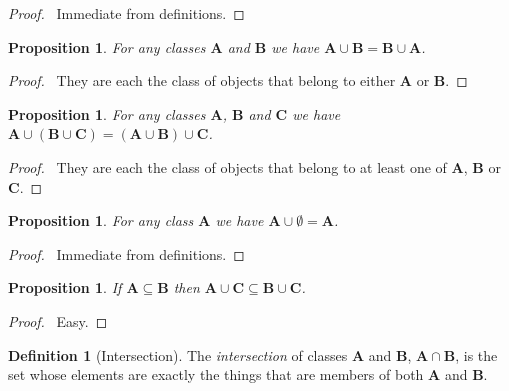 \documentclass{article}
\let\qed\relax
\newtheorem{proposition}[axiom]{Proposition}
\theoremstyle{definition}
\newtheorem{definition}[axiom]{Definition}
\begin{document}
    \begin{proof}
        \pf\ Immediate from definitions. \qed
    \end{proof}

    \begin{proposition}
        For any classes $\mathbf{A}$ and $\mathbf{B}$ we have $\mathbf{A} \cup \mathbf{B}
        = \mathbf{B} \cup \mathbf{A}$.
    \end{proposition}

    \begin{proof}
        \pf\ They are each the class of objects that belong to either $\mathbf{A}$ or $\mathbf{B}$. \qed
    \end{proof}

    \begin{proposition}
        For any classes $\mathbf{A}$, $\mathbf{B}$ and $\mathbf{C}$ we have
        $\mathbf{A} \cup (\mathbf{B} \cup \mathbf{C}) = (\mathbf{A} \cup \mathbf{B}) \cup \mathbf{C}$.
    \end{proposition}

    \begin{proof}
        \pf\ They are each the class of objects that belong to at least one of $\mathbf{A}$,
        $\mathbf{B}$ or $\mathbf{C}$. \qed
    \end{proof}

    \begin{proposition}
        For any class $\mathbf{A}$ we have $\mathbf{A} \cup \emptyset = \mathbf{A}$.
    \end{proposition}

    \begin{proof}
        \pf\ Immediate from definitions. \qed
    \end{proof}

    \begin{proposition}
        If $\mathbf{A} \subseteq \mathbf{B}$ then $\mathbf{A} \cup \mathbf{C} \subseteq \mathbf{B}
        \cup \mathbf{C}$.
    \end{proposition}

    \begin{proof}
        \pf\ Easy. \qed
    \end{proof}

    \begin{definition}[Intersection]
        The \emph{intersection} of classes $\mathbf{A}$ and $\mathbf{B}$, 
        $\mathbf{A} \cap \mathbf{B}$, is the set whose elements are exactly the
        things that are members of both $\mathbf{A}$ and $\mathbf{B}$.
    \end{definition}
\end{document}
